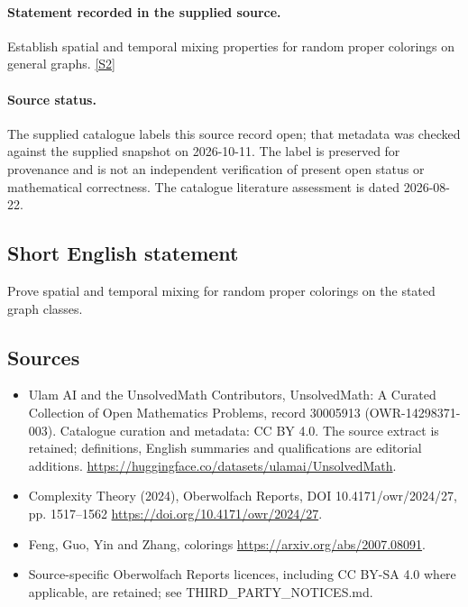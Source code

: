 \documentclass[11pt]{article}
\begin{document}
\paragraph{Statement recorded in the supplied source.}
Establish spatial and temporal mixing properties for random proper colorings on general graphs. \href{https://doi.org/10.4171/owr/2024/27}{[S2]}
\paragraph{Source status.}
The supplied catalogue labels this source record open; that metadata was checked against the supplied snapshot on 2026-10-11. The label is preserved for provenance and is not an independent verification of present open status or mathematical correctness. The catalogue literature assessment is dated 2026-08-22.
\subsection{Short English statement}
Prove spatial and temporal mixing for random proper colorings on the stated graph classes.
\subsection{Sources}
\begin{itemize}
\item[S1] Ulam AI and the UnsolvedMath Contributors, UnsolvedMath: A Curated Collection of Open Mathematics Problems, record 30005913 (OWR-14298371-003). Catalogue curation and metadata: CC BY 4.0. The source extract is retained; definitions, English summaries and qualifications are editorial additions.
\url{https://huggingface.co/datasets/ulamai/UnsolvedMath}.
\item[S2] Complexity Theory (2024), Oberwolfach Reports, DOI 10.4171/owr/2024/27, pp. 1517--1562
\url{https://doi.org/10.4171/owr/2024/27}.
\item[S3] Feng, Guo, Yin and Zhang, colorings
\url{https://arxiv.org/abs/2007.08091}.
\item Source-specific Oberwolfach Reports licences, including CC BY-SA 4.0 where applicable, are retained; see THIRD\_PARTY\_NOTICES.md.
\end{itemize}
\end{document}
